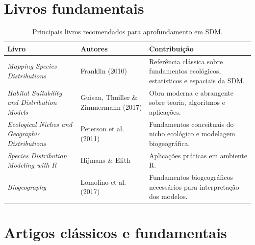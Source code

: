 \documentclass{ueap-sdm}
\begin{document}
\section{Livros fundamentais}

\begin{table}[H]
	\centering
	\caption{Principais livros recomendados para aprofundamento em SDM.}
	\label{tab:livros_sdm}
	
	\small
	
	\begin{tabular}{
			p{}
			p{}
			p{}
		}
		
		\toprule
		
		\textbf{Livro} &
		\textbf{Autores} &
		\textbf{Contribuição}
		
		\\
		\midrule
		
		\textit{Mapping Species Distributions} &
		Franklin (2010) &
		Referência clássica sobre fundamentos ecológicos, estatísticos e espaciais da SDM.
		
		\\
		
		\textit{Habitat Suitability and Distribution Models} &
		Guisan, Thuiller \& Zimmermann (2017) &
		Obra moderna e abrangente sobre teoria, algoritmos e aplicações.
		
		\\
		
		\textit{Ecological Niches and Geographic Distributions} &
		Peterson et al. (2011) &
		Fundamentos conceituais do nicho ecológico e modelagem biogeográfica.
		
		\\
		
		\textit{Species Distribution Modeling with R} &
		Hijmans \& Elith &
		Aplicações práticas em ambiente R.
		
		\\
		
		\textit{Biogeography} &
		Lomolino et al. (2017) &
		Fundamentos biogeográficos necessários para interpretação dos modelos.
		
		\\
		
		\bottomrule
		
	\end{tabular}
	
\end{table}

\section{Artigos clássicos e fundamentais}
\end{document}
